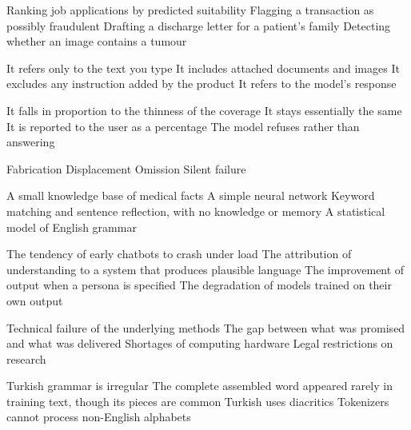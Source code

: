 \documentclass[11pt,a4paper]{article}
\begin{document}

\begin{questions}

  {Ranking job applications by predicted suitability}
  {Flagging a transaction as possibly fraudulent}
  {Drafting a discharge letter for a patient's family}
  {Detecting whether an image contains a tumour}

  {It refers only to the text you type}
  {It includes attached documents and images}
  {It excludes any instruction added by the product}
  {It refers to the model's response}

  {It falls in proportion to the thinness of the coverage}
  {It stays essentially the same}
  {It is reported to the user as a percentage}
  {The model refuses rather than answering}

  {Fabrication}
  {Displacement}
  {Omission}
  {Silent failure}

  {A small knowledge base of medical facts}
  {A simple neural network}
  {Keyword matching and sentence reflection, with no knowledge or memory}
  {A statistical model of English grammar}

  {The tendency of early chatbots to crash under load}
  {The attribution of understanding to a system that produces plausible language}
  {The improvement of output when a persona is specified}
  {The degradation of models trained on their own output}

  {Technical failure of the underlying methods}
  {The gap between what was promised and what was delivered}
  {Shortages of computing hardware}
  {Legal restrictions on research}

  {Turkish grammar is irregular}
  {The complete assembled word appeared rarely in training text, though its pieces are common}
  {Turkish uses diacritics}
  {Tokenizers cannot process non-English alphabets}


\end{questions}
\end{document}
